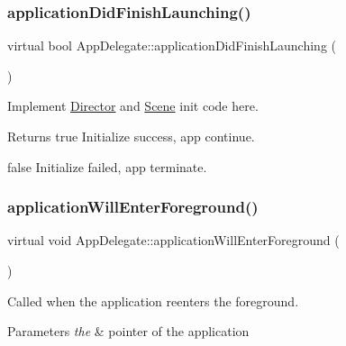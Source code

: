 \subsubsection{\texorpdfstring{application\+Did\+Finish\+Launching()}{applicationDidFinishLaunching()}\hspace{0.1cm}{\footnotesize\ttfamily [4/4]}}
{\footnotesize\ttfamily virtual bool App\+Delegate\+::application\+Did\+Finish\+Launching (\begin{DoxyParamCaption}{ }\end{DoxyParamCaption})\hspace{0.3cm}{\ttfamily [virtual]}}



Implement \hyperlink{classDirector}{Director} and \hyperlink{classScene}{Scene} init code here. 

\begin{DoxyReturn}{Returns}
true Initialize success, app continue. 

false Initialize failed, app terminate. 
\end{DoxyReturn}
\mbox{\label{classAppDelegate_a3d566ef257a887953201bf8fe44de8a4}} 
\subsubsection{\texorpdfstring{application\+Will\+Enter\+Foreground()}{applicationWillEnterForeground()}\hspace{0.1cm}{\footnotesize\ttfamily [1/4]}}
{\footnotesize\ttfamily virtual void App\+Delegate\+::application\+Will\+Enter\+Foreground (\begin{DoxyParamCaption}{ }\end{DoxyParamCaption})\hspace{0.3cm}{\ttfamily [virtual]}}



Called when the application reenters the foreground. 


\begin{DoxyParams}{Parameters}
{\em the} & pointer of the application \\
\hline
\end{DoxyParams}
\mbox{\label{classAppDelegate_ac4d653e3f74a91efef5f2def58fe3108}} 
